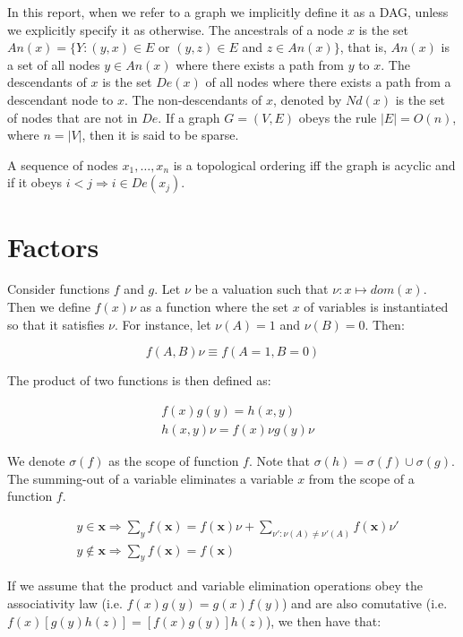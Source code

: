 \documentclass{amsart}
\theoremstyle{plain}
\renewcommand{\implies}{\Rightarrow}
\begin{document}
In this report, when we refer to a graph we implicitly define it as a DAG, unless we explicitly
specify it as otherwise. The ancestrals of a node $x$ is the set $An(x)=\{Y:(y,x)\in E$ or $(y,z)
\in E$ and $z\in An(x)\}$, that is, $An(x)$ is a set of all nodes $y\in An(x)$ where there exists a
path from $y$ to $x$. The descendants of $x$ is the set $De(x)$ of all nodes where there exists a
path from a descendant node to $x$. The non-descendants of $x$, denoted by $Nd(x)$ is the set of
nodes that are not in $De$. If a graph $G=(V,E)$ obeys the rule $|E|=O(n)$, where $n=|V|$, then it
is said to be sparse.

A sequence of nodes $x_1,\ldots,x_n$ is a topological ordering iff the graph is acyclic and if it
obeys $i<j \implies i\in De(x_j)$.

\section{Factors}

Consider functions $f$ and $g$. Let $\nu$ be a valuation such that $\nu : x\mapsto dom(x)$. Then we
define $f(x)\nu$ as a function where the set $x$ of variables is instantiated so that it satisfies
$\nu$. For instance, let $\nu(A)=1$ and $\nu(B)=0$. Then:


\begin{equation*}
  f(A,B)\nu \equiv f(A=1,B=0)
\end{equation*}

The product of two functions is then defined as:

\begin{align*}
  &f(x)g(y)=h(x,y)\\
  &h(x,y)\nu=f(x)\nu g(y)\nu
\end{align*}

We denote $\sigma(f)$ as the scope of function $f$. Note that $\sigma(h)=\sigma(f)\cup\sigma(g)$.
The summing-out of a variable eliminates a variable $x$ from the scope of a function $f$.

\begin{align*}
  &y \in \mathbf{x} \implies \sum_y f(\mathbf{x}) = f(\mathbf{x})\nu + \sum_{\nu':\nu(A)\neq
  \nu'(A)} f(\mathbf{x})\nu'\\
  &y \notin \mathbf{x} \implies \sum_y f(\mathbf{x}) = f(\mathbf{x})
\end{align*}

If we assume that the product and variable elimination operations obey the associativity law (i.e.
$f(x)g(y)=g(x)f(y)$) and are also comutative (i.e. $f(x)[g(y)h(z)]=[f(x)g(y)]h(z)$), we then have
that:
\end{document}
